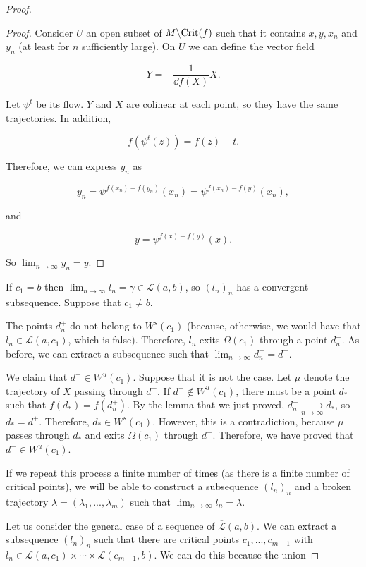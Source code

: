 \begin{proof}
\begin{proof}
Consider $U$ an open subset of $M \backslash \text{Crit}(f)$ such that it contains $x,y, x_n$ and $y_n$ (at least for $n$ sufficiently large). On $U$ we can define the vector field

$$Y = - \frac1{\dd f(X)} X .$$

Let $\psi^t$ be its flow. $Y$ and $X$ are colinear at each point, so they have the same trajectories. In addition,

$$f(\psi^t(z)) = f(z) - t .$$

Therefore, we can express $y_n$ as

$$y_n = \psi^{f(x_n)-f(y_n)}(x_n) = \psi^{f(x_n)-f(y)}(x_n) ,$$

and

$$y = \psi^{f(x)-f(y)}(x) .$$

So $\displaystyle\lim_{n \rightarrow \infty} y_n = y$.
\end{proof}

If $c_1 = b$ then $\displaystyle\lim_{n \rightarrow \infty} l_n = \gamma \in \mathcal{L}(a,b)$, so $(l_n)_n$ has a convergent subsequence. Suppose that $c_1 \neq b$.

The points $d_n^+$ do not belong to $W^s(c_1)$ (because, otherwise, we would have that $l_n \in \mathcal{L}(a,c_1)$, which is false). Therefore, $l_n$ exits $\Omega(c_1)$ through a point $d_n^-$. As before, we can extract a subsequence such that $\displaystyle\lim_{n \rightarrow \infty} d_n^- = d^-$.

We claim that $d^- \in W^u(c_1)$. Suppose that it is not the case. Let $\mu$ denote the trajectory of $X$ passing through $d^-$. If $d^- \notin W^u(c_1)$, there must be a point $d_{\ast}$ such that $f(d_{\ast}) = f(d_n^+)$. By the lemma that we just proved, $d_n^+ \xrightarrow[n \rightarrow \infty]{} d_{\ast}$, so $d_{\ast} = d^+$. Therefore, $d_{\ast} \in W^s(c_1)$. However, this is a contradiction, because $\mu$ passes through $d_{\ast}$ and exits $\Omega(c_1)$ through $d^-$. Therefore, we have proved that $d^- \in W^u(c_1)$.

If we repeat this process a finite number of times (as there is a finite number of critical points), we will be able to construct a subsequence $(l_n)_n$ and a broken trajectory $\lambda = (\lambda_1,...,\lambda_m)$ such that $\displaystyle\lim_{n \rightarrow \infty} l_n = \lambda$.

Let us consider the general case of a sequence of $\overline{\mathcal{L}}(a,b)$. We can extract a subsequence $(l_n)_n$ such that there are critical points $c_1,...,c_{m-1}$ with $l_n \in \mathcal{L}(a,c_1) \times \cdots \times \mathcal{L}(c_{m-1},b)$. We can do this because the union


\end{proof}
